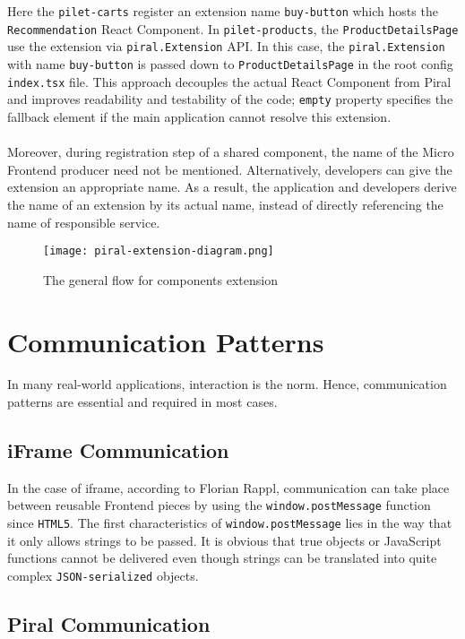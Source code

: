 \documentclass[a4paper]{book}
\begin{document}
Here the \verb|pilet-carts| register an extension name \verb|buy-button| which hosts the \verb|Recommendation| React Component. In \verb|pilet-products|, the \verb|ProductDetailsPage| use the extension via \verb|piral.Extension| API. In this case, the \verb|piral.Extension| with name \verb|buy-button| is passed down to \verb|ProductDetailsPage| in the root config \verb|index.tsx| file. This approach decouples the actual React Component from Piral and improves readability and testability of the code; \verb|empty| property specifies the fallback element if the main application cannot resolve this extension.
\\ \\ 
Moreover, during registration step of a shared component, the name of the Micro Frontend producer need not be mentioned. Alternatively, developers can give the extension an appropriate name. As a result, the application and developers derive the name of an extension by its actual name, instead of directly referencing the name of responsible service.

\begin{figure}[h!]
  \centering
  \captionsetup{justification=centering}
  \texttt{[image: piral-extension-diagram.png]}
  \caption{The general flow for components extension \cite{Rap20}}
  \label{fig:extension-diagram}
\end{figure}

\section{Communication Patterns}
In many real-world applications, interaction is the norm. Hence, communication patterns are essential and required in most cases.
\subsection{iFrame Communication}

In the case of iframe, according to Florian Rappl, communication can take place between reusable Frontend pieces by using the \verb|window.postMessage| function since \verb|HTML5|. The first characteristics of \verb|window.postMessage| lies in the way that it only allows strings to be passed. It is obvious that true objects or JavaScript functions cannot be delivered even though strings can be translated into quite complex \verb|JSON-serialized| objects. \cite{Rap20}

\subsection{Piral Communication}
\end{document}
